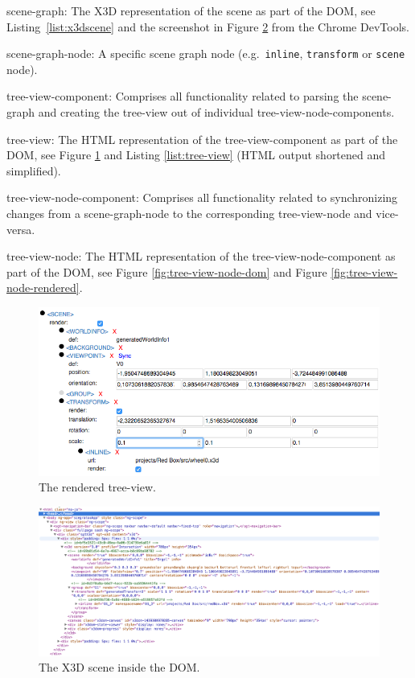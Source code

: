 \begin{description*}
  \item[scene-graph:]
    The \gls{X3D} representation of the scene as part of the \gls{DOM}, see Listing~\ref{list:x3dscene} and the screenshot in Figure \ref{fig:x3dom-dom} from the Chrome DevTools.
  \item[scene-graph-node:]
    A specific scene graph node (e.g.~\texttt{inline}, \texttt{transform} or \texttt{scene} node).
  \item[tree-view-component:]
    Comprises all functionality related to parsing the scene-graph and creating the tree-view out of individual tree-view-node-components.
  \item[tree-view:]
    The \gls{HTML} representation of the tree-view-component as part of the \gls{DOM}, see Figure \ref{fig:tree-view} and Listing \ref{list:tree-view} (\gls{HTML} output
    shortened and simplified).
  \item[tree-view-node-component:]
    Comprises all functionality related to synchronizing changes from a scene-graph-node to the corresponding
    tree-view-node and vice-versa.
  \item[tree-view-node:]
    The \gls{HTML} representation of the tree-view-node-component as part of the \gls{DOM}, see Figure \ref{fig:tree-view-node-dom} and Figure \ref{fig:tree-view-node-rendered}.
\end{description*}

\begin{figure}
  \centering
  \includegraphics[width=\textwidth]{../assets/treeview.png}
  \caption{The rendered tree-view.}
  \label{fig:tree-view}
\end{figure}

\begin{figure}
  \centering
  \includegraphics[width=\textwidth]{../assets/x3dom-dom.png}
  \caption{The \gls{X3D} scene inside the \gls{DOM}.}
  \label{fig:x3dom-dom}
\end{figure}

